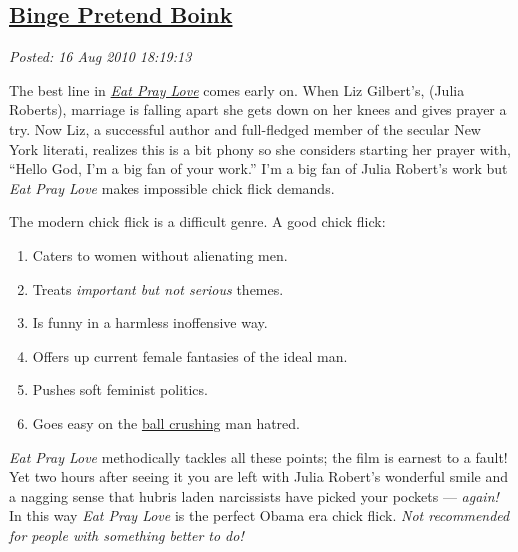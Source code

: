 %

\subsection*{\href{http://bakerjd99.wordpress.com/2010/08/16/binge-pretend-boink/}{Binge Pretend Boink}}


\noindent\emph{Posted: 16 Aug 2010 18:19:13}
\vspace{6pt}



The best line
in \href{http://www.rottentomatoes.com/m/eat\_pray\_love/}{\emph{Eat
Pray Love}} comes early on. When Liz Gilbert's, (Julia Roberts),
marriage is falling apart she gets down on her knees and gives prayer a
try. Now Liz, a successful author and full-fledged member of the secular
New York literati, realizes this is a bit phony so she considers
starting her prayer with, ``Hello God, I'm a big fan of your work.'' I'm
a big fan of Julia Robert's work but \emph{Eat Pray Love} makes
impossible chick flick demands.

The modern chick flick is a difficult genre. A good chick flick:

\begin{enumerate}
\tightlist
\item
  Caters to women without alienating men.
\item
  Treats \emph{important but not serious} themes.
\item
  Is funny in a harmless inoffensive way.
\item
  Offers up current female fantasies of the ideal man.
\item
  Pushes soft feminist politics.
\item
  Goes easy on the
  \href{http://www.urbandictionary.com/define.php?term=ball\%20crush}{ball
  crushing} man hatred.
\end{enumerate}
\emph{Eat Pray Love} methodically tackles all these points; the film is
earnest to a fault! Yet two hours after seeing it you are left with
Julia Robert's wonderful smile and a nagging sense that hubris laden
narcissists have picked your pockets --- \emph{again!} In this way
\emph{Eat Pray Love} is the perfect Obama era chick flick. \emph{Not
recommended for people with something better to do!}

